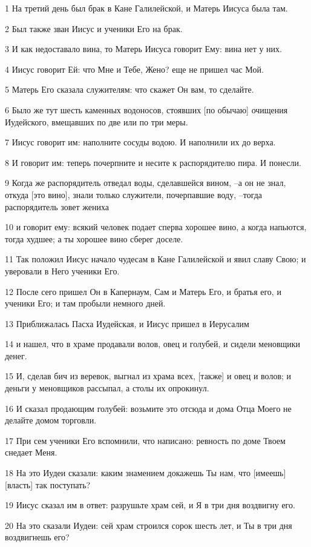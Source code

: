 \par 1 На третий день был брак в Кане Галилейской, и Матерь Иисуса была там.
\par 2 Был также зван Иисус и ученики Его на брак.
\par 3 И как недоставало вина, то Матерь Иисуса говорит Ему: вина нет у них.
\par 4 Иисус говорит Ей: что Мне и Тебе, Жено? еще не пришел час Мой.
\par 5 Матерь Его сказала служителям: что скажет Он вам, то сделайте.
\par 6 Было же тут шесть каменных водоносов, стоявших [по обычаю] очищения Иудейского, вмещавших по две или по три меры.
\par 7 Иисус говорит им: наполните сосуды водою. И наполнили их до верха.
\par 8 И говорит им: теперь почерпните и несите к распорядителю пира. И понесли.
\par 9 Когда же распорядитель отведал воды, сделавшейся вином, --а он не знал, откуда [это вино], знали только служители, почерпавшие воду, --тогда распорядитель зовет жениха
\par 10 и говорит ему: всякий человек подает сперва хорошее вино, а когда напьются, тогда худшее; а ты хорошее вино сберег доселе.
\par 11 Так положил Иисус начало чудесам в Кане Галилейской и явил славу Свою; и уверовали в Него ученики Его.
\par 12 После сего пришел Он в Капернаум, Сам и Матерь Его, и братья его, и ученики Его; и там пробыли немного дней.
\par 13 Приближалась Пасха Иудейская, и Иисус пришел в Иерусалим
\par 14 и нашел, что в храме продавали волов, овец и голубей, и сидели меновщики денег.
\par 15 И, сделав бич из веревок, выгнал из храма всех, [также] и овец и волов; и деньги у меновщиков рассыпал, а столы их опрокинул.
\par 16 И сказал продающим голубей: возьмите это отсюда и дома Отца Моего не делайте домом торговли.
\par 17 При сем ученики Его вспомнили, что написано: ревность по доме Твоем снедает Меня.
\par 18 На это Иудеи сказали: каким знамением докажешь Ты нам, что [имеешь] [власть] так поступать?
\par 19 Иисус сказал им в ответ: разрушьте храм сей, и Я в три дня воздвигну его.
\par 20 На это сказали Иудеи: сей храм строился сорок шесть лет, и Ты в три дня воздвигнешь его?
